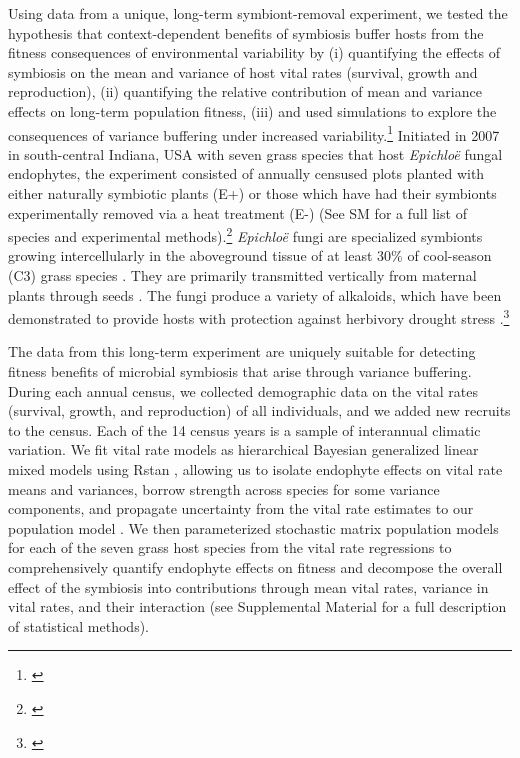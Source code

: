 \documentclass[12pt]{article}
\newcommand{\tom}[2]{{\color{red}{#1}}\footnote{\textit{\color{red}{#2}}}}
\begin{document}
Using data from a unique, long-term symbiont-removal experiment, we tested the hypothesis that context-dependent benefits of symbiosis buffer hosts from the fitness consequences of environmental variability by (i) quantifying the effects of symbiosis on the mean and variance of host vital rates (survival, growth and reproduction), (ii) quantifying the relative contribution of mean and variance effects on long-term population fitness, (iii) and used simulations to explore the consequences of variance buffering under increased variability.\tom{}{I think the life history trait comparisons is an important addition to this list.}
Initiated in 2007 in south-central Indiana, USA with seven grass species that host \emph{Epichlo\"{e}} fungal endophytes, the experiment consisted of annually censused plots planted with either naturally symbiotic plants (E+) or those which have had their symbionts experimentally removed  via a heat treatment (E-) (See SM for a full list of species and experimental methods).\tom{}{If you are going to use symbiotic/non-symbiotic then maybe S+ and S-. ``E'' makes more sense if you are talking specifically about endophytes.}
\emph{Epichlo\"{e}} fungi are specialized symbionts growing intercellularly in the aboveground tissue of at least 30\% of cool-season (C3) grass species \cite{leuchtmann1992systematics}.
They are primarily transmitted vertically from maternal plants through seeds \cite{cheplick2009ecology,rudgers2009fungus}.
The fungi produce a variety of alkaloids, which have been demonstrated to provide hosts with protection against herbivory \cite{brem2001epichloe} drought stress \cite{cheplick2004recovery,kannadan2008endophyte,decunta2021systematic}.\tom{}{I don't think alkaloids have ever been mechanistically connected to drought, so you could re-word this to say that endophytes confer protection against herbivory and drought, likely through synthesis of alkaloids.}

The data from this long-term experiment are uniquely suitable for detecting fitness benefits of microbial symbiosis that arise through variance buffering. 
During each annual census, we collected demographic data on the vital rates (survival, growth, and reproduction) of all individuals, and we added new recruits to the census. 
Each of the 14 census years is a sample of interannual climatic variation.
We fit vital rate models as hierarchical Bayesian generalized linear mixed models using Rstan \cite{rstan2022}, allowing us to isolate endophyte effects on vital rate means and variances, borrow strength across species for some variance components, and propagate uncertainty from the vital rate estimates to our population model \cite{elderd2016quantifying}. 
We then parameterized stochastic matrix population models for each of the seven grass host species from the vital rate regressions to comprehensively quantify endophyte effects on fitness and decompose the overall effect of the symbiosis into contributions through mean vital rates, variance in vital rates, and their interaction (see Supplemental Material for a full description of statistical methods).
\end{document}
